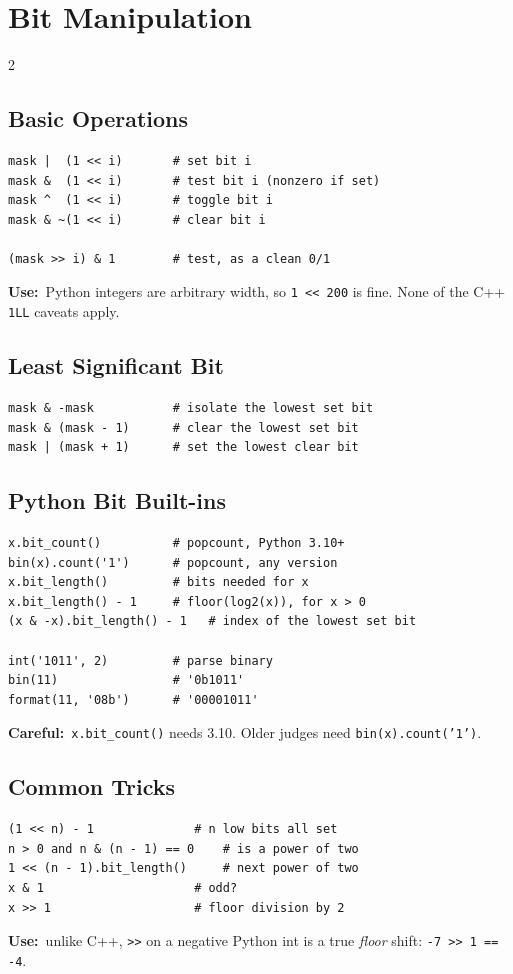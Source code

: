 \documentclass[10pt]{article}
\newcommand{\code}[1]{\texttt{\small #1}}
\newcommand{\uses}[1]{{\color{accent2}\footnotesize\textbf{Use:}}~{\footnotesize #1}\par}
\newcommand{\warn}[1]{{\color{warnc}\footnotesize\textbf{Careful:}}~{\footnotesize #1}\par}
\begin{document}
\section{Bit Manipulation}
\begin{multicols}{2}

\subsection{Basic Operations}
\begin{lstlisting}
mask |  (1 << i)       # set bit i
mask &  (1 << i)       # test bit i (nonzero if set)
mask ^  (1 << i)       # toggle bit i
mask & ~(1 << i)       # clear bit i

(mask >> i) & 1        # test, as a clean 0/1
\end{lstlisting}
\uses{Python integers are arbitrary width, so \code{1 << 200} is fine.
None of the C++ \code{1LL} caveats apply.}

\subsection{Least Significant Bit}
\begin{lstlisting}
mask & -mask           # isolate the lowest set bit
mask & (mask - 1)      # clear the lowest set bit
mask | (mask + 1)      # set the lowest clear bit
\end{lstlisting}

\subsection{Python Bit Built-ins}
\begin{lstlisting}
x.bit_count()          # popcount, Python 3.10+
bin(x).count('1')      # popcount, any version
x.bit_length()         # bits needed for x
x.bit_length() - 1     # floor(log2(x)), for x > 0
(x & -x).bit_length() - 1   # index of the lowest set bit

int('1011', 2)         # parse binary
bin(11)                # '0b1011'
format(11, '08b')      # '00001011'
\end{lstlisting}
\warn{\code{x.bit\_count()} needs 3.10. Older judges need
\code{bin(x).count('1')}.}

\subsection{Common Tricks}
\begin{lstlisting}
(1 << n) - 1              # n low bits all set
n > 0 and n & (n - 1) == 0    # is a power of two
1 << (n - 1).bit_length()     # next power of two
x & 1                     # odd?
x >> 1                    # floor division by 2
\end{lstlisting}
\uses{unlike C++, \code{>>} on a negative Python int is a true
\emph{floor} shift: \code{-7 >> 1 == -4}.}


\end{multicols}
\end{document}
